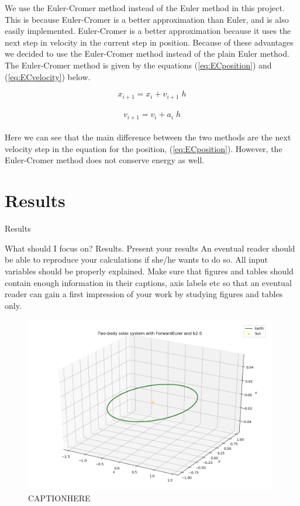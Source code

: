 \documentclass{article}
\begin{document}
    We use the Euler-Cromer method instead of the Euler method in this project. This is because Euler-Cromer is a better approximation than Euler, and is also easily implemented. Euler-Cromer is a better approximation because it uses the next step in velocity in the current step in position. Because of these advantages we decided to use the Euler-Cromer method instead of the plain Euler method. The Euler-Cromer method is given by the equations (\ref{eq:ECposition}) and (\ref{eq:ECvelocity}) below.

    \begin{equation}    \label{eq:ECposition}
        x_{i+1} = x_i + v_{i+1} \; h
    \end{equation} \\

    \begin{equation}    \label{eq:ECvelocity}
        v_{i+1} = v_i + a_i \; h
    \end{equation} \\

    Here we can see that the main difference between the two methods are the next velocity step in the equation for the position, (\ref{eq:ECposition}). However, the Euler-Cromer method does not conserve energy as well.



\vspace{1cm}

\section{Results} \label{sec:Results}

    Results

    What should I focus on? Results.
    Present your results
    An eventual reader should be able to reproduce your calculations if she/he wants to do so. All input variables should be properly explained.
    Make sure that figures and tables should contain enough information in their captions, axis labels etc so that an eventual reader can gain a first impression of your work by studying  figures and tables only.

    \begin{figure}[H]
        \centering
        \includegraphics[width = 11cm]{img/plot3D_S_E_F_b20.png}
        \caption{CAPTIONHERE}
        \label{fig:plot3D_S_E_F_b20}
    \end{figure}
\end{document}
